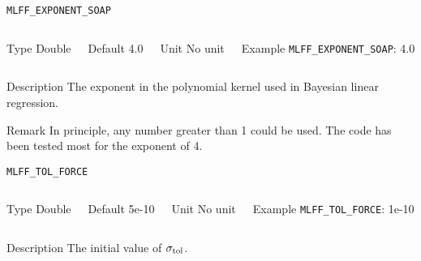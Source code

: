 \begin{frame}[allowframebreaks]{\texttt{{MLFF\_EXPONENT\_SOAP}}} \label{MLFF_EXPONENT_SOAP}
\vspace*{-12pt}
\begin{columns}
\begin{block}{Type}
Double
\end{block}

\begin{block}{Default}
4.0
\end{block}

\begin{block}{Unit}
No unit
\end{block}

\begin{block}{Example}
\texttt{MLFF\_EXPONENT\_SOAP}: 4.0
\end{block}
\end{columns}

\begin{block}{Description}
 The exponent in the polynomial kernel used in Bayesian linear regression.
\end{block}

\begin{block}{Remark}
In principle, any number greater than 1 could be used. The code has been tested most for the exponent of 4.
\end{block}
\end{frame}

\begin{frame}[allowframebreaks]{\texttt{{MLFF\_TOL\_FORCE}}} \label{MLFF_TOL_FORCE}
\vspace*{-12pt}
\begin{columns}
\begin{block}{Type}
Double
\end{block}

\begin{block}{Default}
5e-10
\end{block}

\begin{block}{Unit}
No unit
\end{block}

\begin{block}{Example}
\texttt{MLFF\_TOL\_FORCE}: 1e-10
\end{block}
\end{columns}

\begin{block}{Description}
 The initial value of $\sigma_{\rm tol}$.
\end{block}

%
\end{frame}

